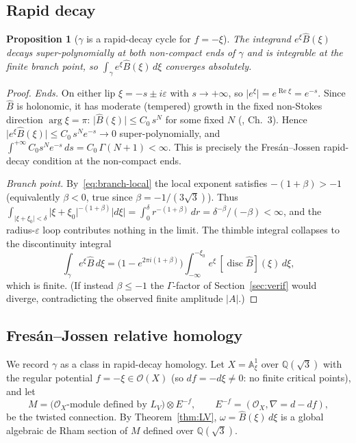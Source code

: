 \documentclass[11pt,reqno]{amsart}
\theoremstyle{plain}
\newtheorem{proposition}[theorem]{Proposition}
\theoremstyle{definition}
\newcommand{\Bhat}{\widehat{B}}
\newcommand{\LV}{L_{V}}
\newcommand{\Qsqrt}{\mathbb{Q}(\sqrt3)}
\newcommand{\xizero}{\xi_0}
\begin{document}
\subsection{Rapid decay}
\begin{proposition}[$\gamma$ is a rapid-decay cycle for $f=-\xi$]\label{prop:rapiddecay}
The integrand $e^{\xi}\Bhat(\xi)$ decays super-polynomially at both non-compact ends of $\gamma$
and is integrable at the finite branch point, so $\int_\gamma e^{\xi}\Bhat(\xi)\,d\xi$ converges
absolutely.
\end{proposition}

\begin{proof}
\emph{Ends.} On either lip $\xi=-s\pm i\varepsilon$ with $s\to+\infty$, so
$\lvert e^{\xi}\rvert=e^{\operatorname{Re}\xi}=e^{-s}$. Since $\Bhat$ is holonomic, it has
moderate (tempered) growth in the fixed non-Stokes direction $\arg\xi=\pi$: $\lvert\Bhat(\xi)\rvert
\le C_0\,s^{N}$ for some fixed $N$ (\cite{vdPS}, Ch.~3). Hence
$\lvert e^{\xi}\Bhat(\xi)\rvert\le C_0\,s^{N}e^{-s}\to0$ super-polynomially, and
$\int^{+\infty}C_0 s^N e^{-s}\,ds=C_0\,\Gamma(N+1)<\infty$. This is precisely the Fres\'an--Jossen
rapid-decay condition at the non-compact ends.

\emph{Branch point.} By~\eqref{eq:branch-local} the local exponent satisfies $-(1+\beta)>-1$
(equivalently $\beta<0$, true since $\beta=-1/(3\sqrt3)$). Thus
$\int_{\lvert\xi+\xizero\rvert<\delta}\lvert\xi+\xizero\rvert^{-(1+\beta)}\lvert d\xi\rvert
=\int_0^\delta r^{-(1+\beta)}\,dr=\delta^{-\beta}/(-\beta)<\infty$, and the radius-$\varepsilon$
loop contributes nothing in the limit. The thimble integral collapses to the discontinuity
integral
\begin{equation}\label{eq:disc}
  \int_\gamma e^{\xi}\Bhat\,d\xi
  =\bigl(1-e^{2\pi i(1+\beta)}\bigr)\int_{-\infty}^{-\xizero}e^{\xi}\,[\operatorname{disc}\Bhat](\xi)\,d\xi,
\end{equation}
which is finite. (If instead $\beta\le-1$ the $\Gamma$-factor of Section~\ref{sec:verif} would
diverge, contradicting the observed finite amplitude $\lvert A\rvert$.)
\end{proof}

\subsection{Fres\'an--Jossen relative homology}
We record $\gamma$ as a class in rapid-decay homology. Let $X=\mathbb{A}^1_\xi$ over $\Qsqrt$ with
the regular potential $f=-\xi\in\mathcal{O}(X)$ (so $df=-d\xi\ne0$: no finite critical points), and
let
\begin{equation}\label{eq:Mmotive}
  M=\bigl(\mathcal{O}_X\text{-module defined by }\LV\bigr)\otimes E^{-f},\qquad
  E^{-f}=(\mathcal{O}_X,\nabla=d-df),
\end{equation}
be the twisted connection. By Theorem~\ref{thm:LV}, $\omega=\Bhat(\xi)\,d\xi$ is a global algebraic
de Rham section of $M$ defined over $\Qsqrt$.
\end{document}
